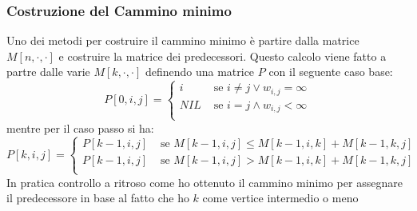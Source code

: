 \documentclass[a4paper,12pt, oneside]{book}
\begin{document}
\subsubsection{Costruzione del Cammino minimo}
Uno dei metodi per costruire il cammino minimo è partire dalla matrice
$M[n,\cdot, \cdot]$ e costruire la matrice dei predecessori. Questo
calcolo viene fatto a partre dalle varie $M[k,\cdot,\cdot]$ definendo
una matrice $P$ con il seguente caso base:
\[P[0,i,j]=
  \begin{cases}
    i & \mbox{ se }i\neq j\vee w_{i,j}=\infty\\
    NIL & \mbox{ se }i= j\wedge w_{i,j}<\infty\\
  \end{cases}
\]
mentre per il caso passo si ha:
\[P[k,i,j]=
  \begin{cases}
    P[k-1,i,j] & \mbox{ se }M[k-1,i,j]\leq M[k-1,i,k]+M[k-1,k,j]\\ 
    P[k-1,i,j] & \mbox{ se }M[k-1,i,j]> M[k-1,i,k]+M[k-1,k,j]\\
  \end{cases}
\]
In pratica controllo a ritroso come ho ottenuto il cammino minimo per
assegnare il predecessore in base al fatto che ho $k$ come vertice
intermedio o meno
\end{document}
